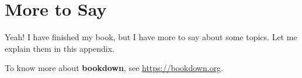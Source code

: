 \documentclass[
]{krantz}
\begin{document}
\cleardoublepage

\hypertarget{appendix-appendix}{%
\appendix {}}


\hypertarget{more-to-say}{%
\chapter{More to Say}\label{more-to-say}}

Yeah! I have finished my book, but I have more to say about some topics. Let me explain them in this appendix.

To know more about \textbf{bookdown}, see \url{https://bookdown.org}.

  

\backmatter
\printindex
\end{document}
